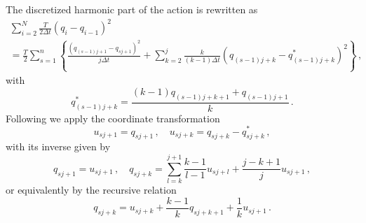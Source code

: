 \documentclass[11pt, a4paper]{article}
\newcommand{\bt}{\pmb\theta}
\begin{document}
The discretized harmonic part of the action is rewritten as
\begin{multline}
  \sum_{i=2}^{N}
  \frac{T}{2\Delta t}
  (q_i-q_{i-1})^2
  \\ =
  \frac{T}{2}
  \sum_{s=1}^{n}\left\{
    \frac{(q_{(s-1)j+1} - q_{sj+1})^2}{j\Delta t}
    +
    \sum_{k=2}^j
    \frac{k}{(k-1)\Delta t}
    (q_{(s-1)j+k}-q^*_{(s-1)j+k})^2
  \right\}\,,
\end{multline}
with
\begin{equation}
  q^*_{(s-1)j+k}
  =
  \frac{(k-1)q_{(s-1)j+k+1} + q_{(s-1)j+1} }{k}
  \,.
\end{equation}
Following \cite{tuckerman1993efficient} we apply the coordinate transformation
\begin{equation}
  u_{sj+1} = q_{sj+1}\,,\quad
  u_{sj+k} = q_{sj+k} - q^*_{sj+k}\,,
\end{equation}
with its inverse given by
\begin{equation}
  q_{sj+1} = u_{sj+1}\,,\quad
  q_{sj+k} = \sum_{l=k}^{j+1}\frac{k-1}{l-1}u_{sj+l}
  +\frac{j-k+1}{j}u_{sj+1}\,,
\end{equation}
or equivalently by the recursive relation
\begin{equation}
  q_{sj+k} = u_{sj+k} + \frac{k-1}{k} q_{sj+k+1}+ \frac{1}{k}u_{sj+1} \,.
\end{equation}
%
%
%
\end{document}
